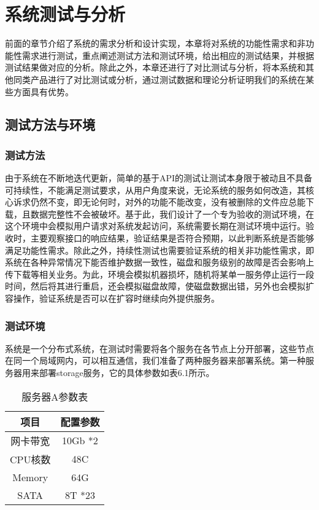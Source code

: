 
\chapter{系统测试与分析}
前面的章节介绍了系统的需求分析和设计实现，本章将对系统的功能性需求和非功能性需求进行测试，重点阐述测试方法和测试环境，给出相应的测试结果，并根据测试结果做对应的分析。除此之外，本章还进行了对比测试与分析，将本系统和其他同类产品进行了对比测试或分析，通过测试数据和理论分析证明我们的系统在某些方面具有优势。

\section{测试方法与环境}%
\subsection{测试方法}%
由于系统在不断地迭代更新，简单的基于API的测试让测试本身限于被动且不具备可持续性，不能满足测试要求，从用户角度来说，无论系统的服务如何改造，其核心诉求仍然不变，即无论何时，对外的功能不能改变，没有被删除的文件应总能下载，且数据完整性不会被破坏。基于此，我们设计了一个专为验收的测试环境，在这个环境中会模拟用户请求对系统发起访问，系统需要长期在测试环境中运行。验收时，主要观察接口的响应结果，验证结果是否符合预期，以此判断系统是否能够满足功能性需求。除此之外，持续性测试也需要验证系统的相关非功能性需求，即系统在各种异常情况下能否维护数据一致性，磁盘和服务级别的故障是否会影响上传下载等相关业务。为此，环境会模拟机器损坏，随机将某单一服务停止运行一段时间，然后将其进行重启，还会模拟磁盘故障，使磁盘数据出错，另外也会模拟扩容操作，验证系统是否可以在扩容时继续向外提供服务。

\subsection{测试环境}%
系统是一个分布式系统，在测试时需要将各个服务在各节点上分开部署，这些节点在同一个局域网内，可以相互通信，我们准备了两种服务器来部署系统。第一种服务器用来部署storage服务，它的具体参数如表6.1所示。

\begin{table}[h]
    \centering
    \vspace{10pt}
    \caption{服务器A参数表}
    \vspace{-15pt}
    \begin{tabular}{cc}
      \toprule
      项目   & 配置参数   \\
      \midrule
      网卡带宽  & 10Gb *2  \\
      CPU核数   & 48C     \\
      Memory   & 64G      \\
      SATA     & 8T *23   \\
      \bottomrule
    \end{tabular}
\end{table}

